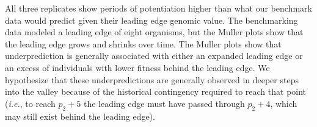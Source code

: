 All three replicates show periods of potentiation higher than what our benchmark data would predict given their leading edge genomic value. 
The benchmarking data modeled a leading edge of eight organisms, but the Muller plots show that the leading edge grows and shrinks over time. 
The Muller plots show that underprediction is generally associated with either an expanded leading edge or an excess of individuals with lower fitness behind the leading edge. 
We hypothesize that these underpredictions are generally observed in deeper steps into the valley because of the historical contingency required to reach that point (\textit{i.e.}, to reach $p_{2} + 5$ the leading edge must have passed through $p_{2} + 4$, which may still exist behind the leading edge).

